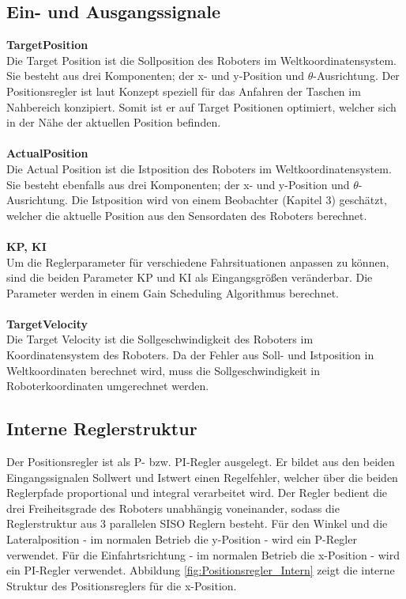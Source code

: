 \subsection{Ein- und Ausgangssignale}
\textbf{TargetPosition}\\
Die Target Position ist die Sollposition des Roboters im Weltkoordinatensystem. Sie besteht aus drei Komponenten; der x- und y-Position und $\theta$-Ausrichtung. Der Positionsregler ist laut Konzept speziell für das Anfahren der Taschen im Nahbereich konzipiert. Somit ist er auf Target Positionen optimiert, welcher sich in der Nähe der aktuellen Position befinden. \\
\\
\textbf{ActualPosition}\\
Die Actual Position ist die Istposition des Roboters im Weltkoordinatensystem. Sie besteht ebenfalls aus drei Komponenten; der x- und y-Position und $\theta$-Ausrichtung. Die Istposition wird von einem Beobachter (Kapitel 3) geschätzt, welcher die aktuelle Position aus den Sensordaten des Roboters berechnet.\\
\\
\textbf{KP, KI}\\  
Um die Reglerparameter für verschiedene Fahrsituationen anpassen zu können, sind die beiden Parameter KP und KI als Eingangsgrößen veränderbar. Die Parameter werden in einem Gain Scheduling Algorithmus berechnet.\\
\\
\textbf{TargetVelocity}
\\
Die Target Velocity ist die Sollgeschwindigkeit des Roboters im Koordinatensystem des Roboters. Da der Fehler aus Soll- und Istposition in Weltkoordinaten berechnet wird, muss die Sollgeschwindigkeit in Roboterkoordinaten umgerechnet werden. 

\subsection{Interne Reglerstruktur}
Der Positionsregler ist als P- bzw. PI-Regler ausgelegt. Er bildet aus den beiden Eingangssignalen Sollwert und Istwert einen Regelfehler, welcher über die beiden Reglerpfade proportional und integral verarbeitet wird. Der Regler bedient die drei Freiheitsgrade des Roboters unabhängig voneinander, sodass die Reglerstruktur aus 3 parallelen SISO Reglern besteht. Für den Winkel und die Lateralposition - im normalen Betrieb die y-Position - wird ein P-Regler verwendet. Für die Einfahrtsrichtung - im normalen Betrieb die x-Position - wird ein PI-Regler verwendet. Abbildung \ref{fig:Positionsregler_Intern} zeigt die interne Struktur des Positionsreglers für die x-Position.


